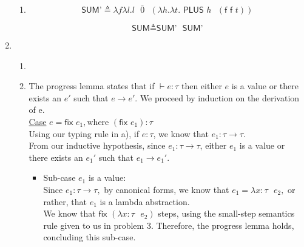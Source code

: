 \documentclass[10pt, oneside]{article}
\begin{document}
\begin{enumerate}
\begin{enumerate}
		\item $$\textsf{SUM'} \triangleq \lambda f\lambda l.l \text{ } \bar{0} \text{ } (\lambda h.\lambda t.\textsf{ PLUS } h \text{ } (\textsf{f f } t))$$
		
			$$\textsf{SUM} \triangleq \textsf{SUM'} \textsf{ } \textsf{SUM'}$$
		
	\end{enumerate}
	
	\item 
		\begin{enumerate}
		\item \text{ } \\
		\begin{prooftree}
		\end{prooftree}
		
	\pagebreak
		\item The progress lemma states that if $\vdash e : \tau $ then either $e$ is a value or there exists an $e'$ such that $ e \rightarrow e'.$
		We proceed by induction on the derivation of e.\\
					
		\underline{\sc Case} $e =  \textsf{fix } e_1, \text{where } (\textsf{fix } e_1) : \tau $\\
		
		Using our typing rule in a), if $e: \tau$, we know that $e_1: \tau \rightarrow \tau$.\\
				
		From our inductive hypothesis, since  $e_1: \tau \rightarrow \tau$,  either $e_1$ is a value or there exists an $e_1'$ such that $e_1 \rightarrow e_1'.$\\
		
		\begin{itemize}
		
				
		\item {\sc Sub-case} $e_1$ is a value:\\
		
		Since $e_1: \tau \rightarrow \tau,$ by canonical forms, we know that $e_1 = \lambda x:\tau \text{ } e_2,$ or rather, that $e_1$ is a lambda abstraction.\\
		
		We know that $\textsf{fix } (\lambda x:\tau \text{ } e_2)$ steps, using the small-step semantics rule given to us in problem 3. Therefore, the progress lemma holds, concluding this sub-case. \checkmark \checkmark \\
		

\end{itemize}
\end{enumerate}
\end{enumerate}
\end{document}

